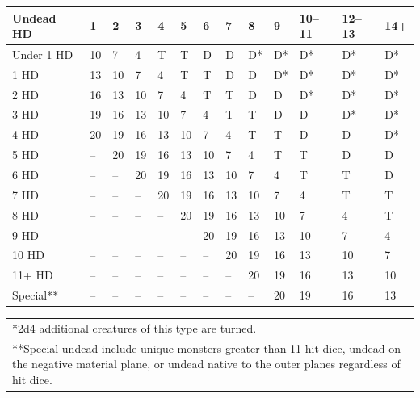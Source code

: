 \noindent
\begin{minipage}{\columnwidth}

\label{turnundead}
\noindent
\begin{tabular}{|p{}|p{}|p{}|p{}|p{}|p{}|p{}|p{}|p{}|p{}|p{}|p{}|p{}|}
\hline
Undead HD	& 1	& 2	& 3	& 4	& 5	& 6	& 7	& 8	& 9	& 10--11	& 12--13	& 14+ \\
\hline\hline
\rowcolor[gray]{.9}Under 1 HD	& 10	& 7	& 4	& T	& T	& D	& D	& D*	& D*	& D*	& D*	& D* \\
1 HD	& 13	& 10	& 7	& 4	& T	& T	& D	& D	& D*	& D*	& D*	& D* \\
\rowcolor[gray]{.9}2 HD	& 16	& 13	& 10	& 7	& 4	& T	& T	& D	& D	& D*	& D*	& D* \\
3 HD	& 19	& 16	& 13	& 10	& 7	& 4	& T	& T	& D	& D	& D*	& D* \\
\rowcolor[gray]{.9}4 HD	& 20	& 19	& 16	& 13	& 10	& 7	& 4	& T	& T	& D	& D	& D* \\
5 HD	& --	& 20	& 19	& 16	& 13	& 10	& 7	& 4	& T	& T	& D	& D \\
\rowcolor[gray]{.9}6 HD	& --	& --	& 20	& 19	& 16	& 13	& 10	& 7	& 4	& T	& T	& D \\
7 HD	& --	& --	& --	& 20	& 19	& 16	& 13	& 10	& 7	& 4	& T	& T \\
\rowcolor[gray]{.9}8 HD	& --	& --	& --	& --	& 20	& 19	& 16	& 13	& 10	& 7	& 4	& T \\
9 HD	& --	& --	& --	& --	& --	& 20	& 19	& 16	& 13	& 10	& 7	& 4 \\
\rowcolor[gray]{.9}10 HD	& --	& --	& --	& --	& --	& --	& 20	& 19	& 16	& 13	& 10	& 7 \\
11+ HD	& --	& --	& --	& --	& --	& --	& --	& 20	& 19	& 16	& 13	& 10 \\
\rowcolor[gray]{.9}Special**	& --	& --	& --	& --	& --	& --	& --	& --	& 20	& 19	& 16	& 13 \\
\hline
\end{tabular}
\noindent\begin{tabular}{p{}}
*2d4 additional creatures of this type are turned. \\
**Special undead include unique monsters greater than 11 hit dice, undead on the negative material plane, or undead native to the outer planes regardless of hit dice. \\
\end{tabular}\vspace{.5em}

\end{minipage}

